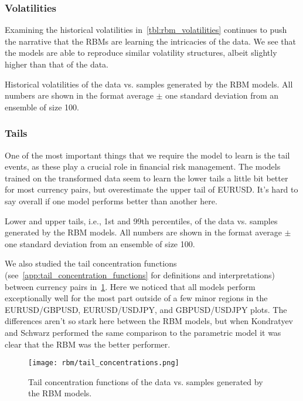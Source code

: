 \subsubsection{Volatilities}
Examining the historical volatilities in~\cref{tbl:rbm_volatilities} continues to push the narrative that the RBMs are learning the intricacies of the data.
We see that the models are able to reproduce similar volatility structures, albeit slightly higher than that of the data.
\begin{table}[!htb]
    \centering
    \begin{adjustbox}{max width=\textwidth}
        
    \end{adjustbox}
    \caption{Historical volatilities of the data vs. samples generated by the RBM models. All numbers are shown in the format average \(\pm\) one standard deviation from an ensemble of size 100.}
    \label{tbl:rbm_volatilities}
\end{table}

\subsubsection{Tails}
One of the most important things that we require the model to learn is the tail events, as these play a crucial role in financial risk management.
The models trained on the transformed data seem to learn the lower tails a little bit better for most currency pairs, but overestimate the upper tail of EURUSD.
It's hard to say overall if one model performs better than another here.
\begin{table}[!htb]
    \centering
    \begin{adjustbox}{max width=\textwidth}
        
    \end{adjustbox}
    \caption{Lower and upper tails, i.e., 1st and 99th percentiles, of the data vs. samples generated by the RBM models. All numbers are shown in the format average \(\pm\) one standard deviation from an ensemble of size 100.}
    \label{tbl:rbm_tails}
\end{table}
We also studied the tail concentration functions (see~\cref{app:tail_concentration_functions} for definitions and interpretations) between currency pairs in~\cref{fig:rbm_tail_concentrations}.
Here we noticed that all models perform exceptionally well for the most part outside of a few minor regions in the EURUSD/GBPUSD, EURUSD/USDJPY, and GBPUSD/USDJPY plots.
The differences aren't so stark here between the RBM models, but when Kondratyev and Schwarz performed the same comparison to the parametric model it was clear that the RBM was the better performer.
\begin{figure}[!htb]
    \begin{center}
        \texttt{[image: rbm/tail\_concentrations.png]}
    \end{center}
    \caption{Tail concentration functions of the data vs. samples generated by the RBM models.}
    \label{fig:rbm_tail_concentrations}
\end{figure}


